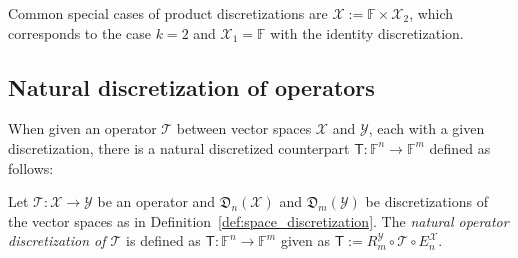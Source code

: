 \documentclass[a4paper]{paper}
\newcommand{\Discr}{\mathfrak{D}}
\newcommand{\Spc}[1]{\mathscr{#1}}
\newcommand{\Field}{\mathbb{F}}
\newcommand{\Op}[1]{\mathcal{#1}}
\newcommand{\DiscOp}[1]{\mathsf{#1}}
\newcommand*{\EXT}[2]{\ensuremath{E_{#1}^{#2}}}
\newcommand*{\REST}[2]{\ensuremath{R_{#1}^{#2}}}
\newcommand*{\RmY}{\ensuremath{\REST{m}{\Spc{Y}}}}
\newcommand*{\EnX}{\ensuremath{\EXT{n}{\Spc{X}}}}
\begin{document}
%
Common special cases of product discretizations are $\Spc{X}:=\Field \times \Spc{X}_2$, which corresponds to the case 
$k=2$ and $\Spc{X}_1=\Field$ with the identity discretization.


\subsection{Natural discretization of operators}

When given an operator $\Op{T}$ between vector spaces $\Spc{X}$ and $\Spc{Y}$, each with a given discretization, 
there is a natural discretized counterpart $\DiscOp{T} \colon \Field^n \to \Field^m$ defined as follows:

\begin{definition}
 \label{def:operator_discretization}
 Let $\Op{T}\colon \Spc{X} \to \Spc{Y}$ be an operator and $\Discr_n(\Spc{X})$ and $\Discr_m(\Spc{Y})$ be 
 discretizations of the vector spaces as in Definition~\ref{def:space_discretization}. The \emph{natural operator 
 discretization of $\Op{T}$} is defined as $\DiscOp{T} \colon \Field^n \to \Field^m$ given as 
 $\DiscOp{T} := \RmY \circ \Op{T} \circ \EnX$.
\end{definition}
\end{document}
